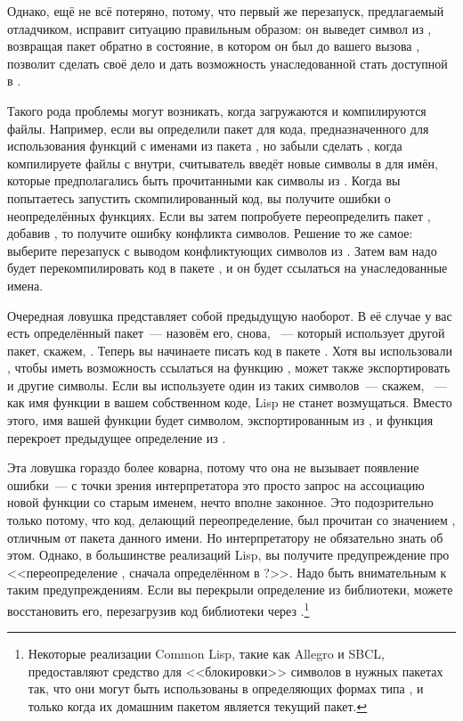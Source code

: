 Однако, ещё не всё потеряно, потому, что первый же перезапуск, предлагаемый отладчиком,
исправит ситуацию правильным образом: он выведет символ  из
, возвращая пакет  обратно в состояние, в котором он
был до вашего вызова , позволит  сделать своё дело и дать
возможность унаследованной  стать доступной в .

Такого рода проблемы могут возникать, когда загружаются и компилируются файлы. Например,
если вы определили пакет  для кода, предназначенного для использования
функций с именами из пакета , но забыли сделать , когда
компилируете файлы с  внутри, считыватель введёт новые символы
в  для имён, которые предполагались быть прочитанными как символы из
. Когда вы попытаетесь запустить скомпилированный код, вы получите ошибки о
неопределённых функциях. Если вы затем попробуете переопределить пакет ,
добавив , то получите ошибку конфликта символов. Решение то же самое:
выберите перезапуск с выводом конфликтующих символов из . Затем вам надо
будет перекомпилировать код в пакете , и он будет ссылаться на унаследованные
имена.

Очередная ловушка представляет собой предыдущую наоборот. В её случае у вас есть
определённый пакет~--- назовём его, снова, ~--- который использует другой
пакет, скажем, . Теперь вы начинаете писать код в пакете . Хотя
вы использовали , чтобы иметь возможность ссылаться на функцию ,
 может также экспортировать и другие символы. Если вы используете один из
таких символов~--- скажем, ~--- как имя функции в вашем собственном коде, Lisp
не станет возмущаться. Вместо этого, имя вашей функции будет символом, экспортированным из
, и функция перекроет предыдущее определение  из .

Эта ловушка гораздо более коварна, потому что она не вызывает появление ошибки~--- с точки
зрения интерпретатора это просто запрос на ассоциацию новой функции со старым именем,
нечто вполне законное. Это подозрительно только потому, что код, делающий переопределение,
был прочитан со значением , отличным от пакета данного имени. Но
интерпретатору не обязательно знать об этом. Однако, в большинстве реализаций Lisp, вы получите
предупреждение про <<переопределение , сначала определённом в ?>>. Надо быть
внимательным к таким предупреждениям. Если вы перекрыли определение из библиотеки, можете
восстановить его, перезагрузив код библиотеки через .\footnote{Некоторые
  реализации Common Lisp, такие как Allegro и SBCL, предоставляют средство для
  <<блокировки>> символов в нужных пакетах так, что они могут быть использованы в
  определяющих формах типа ,  и  только когда их
  домашним пакетом является текущий пакет.}

